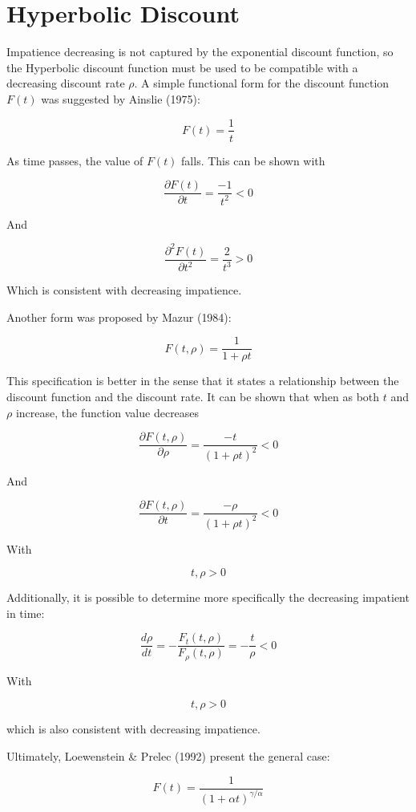 \documentclass[]{article}
\begin{document}
\hypertarget{hyperbolic-discount}{%
\section{Hyperbolic Discount}\label{hyperbolic-discount}}

Impatience decreasing is not captured by the exponential discount function, so the Hyperbolic discount function must be used to be compatible with a decreasing discount rate \(\rho\). A simple functional form for the discount function \(F(t)\) was suggested by Ainslie (1975):

\[
F(t)= \frac{1}{t}
\]

As time passes, the value of \(F(t)\) falls. This can be shown with

\[
\frac{\partial F(t)}{\partial t}= \frac{-1}{t^2} <0
\]

And

\[
\frac{\partial^2 F(t)}{\partial t^2}= \frac{2}{t^3} > 0
\]

Which is consistent with decreasing impatience.

Another form was proposed by Mazur (1984):

\[
F(t, \rho)= \frac{1}{1 + \rho t}
\]

This specification is better in the sense that it states a relationship between the discount function and the discount rate. It can be shown that when as both \(t\) and \(\rho\) increase, the function value decreases

\[
\frac{\partial F(t, \rho)}{\partial \rho}= \frac{-t}{(1 + \rho t)^2} < 0 
\]

And

\[
\frac{\partial F(t, \rho)}{\partial t} = \frac{-\rho}{(1 + \rho t)^2} < 0 
\]

With

\[
t, \rho > 0
\]

Additionally, it is possible to determine more specifically the decreasing impatient in time:

\[
\frac{d \rho}{d t} = -\frac{F_{t}(t, \rho)}{F_{\rho}(t, \rho)} =  -\frac{t}{\rho} < 0
\]

With

\[
t, \rho > 0
\]

which is also consistent with decreasing impatience.

Ultimately, Loewenstein \& Prelec (1992) present the general case:

\[
F(t)= \frac{1}{(1 + \alpha t)^{\gamma/\alpha}} 
\]
\end{document}
